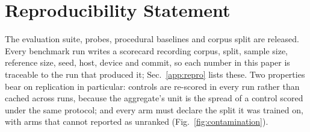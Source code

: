 \section{Reproducibility Statement}
\label{app:repro-statement}

The evaluation suite, probes, procedural baselines and corpus split are
released. Every benchmark run writes a scorecard
recording corpus, split, sample size, reference size, seed, host, device and
commit, so each number in this paper is traceable to the run that produced it;
Sec.~\ref{app:repro} lists these. Two properties bear on replication in
particular: controls are re-scored in every run rather than cached across runs,
because the aggregate's unit is the spread of a control scored under the same
protocol; and every arm must declare the split it was trained on, with arms that
cannot reported as unranked (Fig.~\ref{fig:contamination}).
